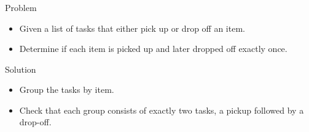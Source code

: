 \begin{frame}
    \frametitle{\problemtitle}
    \begin{block}{Problem}
        \begin{itemize}
            \item Given a list of tasks that either pick up or drop off an item. 
            \item Determine if each item is picked up and later dropped off exactly once.
        \end{itemize}
    \end{block}
    \pause
    \begin{block}{Solution}
        \begin{itemize}
            \item<+-> Group the tasks by item.
            \item<+-> Check that each group consists of exactly two tasks, a pickup followed by a drop-off.
        \end{itemize}
    \end{block}
\end{frame}
